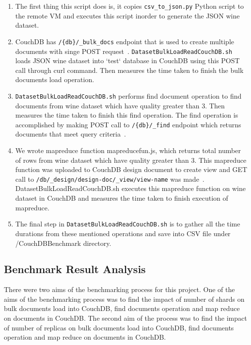 \begin{enumerate}
  \item The first thing this script does is, it copies
    \verb|csv_to_json.py| Python script to the remote VM and executes
    this script inorder to generate the JSON wine dataset.
  \item CouchDB has \verb|/{db}/_bulk_docs| endpoint that is used to
    create multiple documents with singe POST
    request~\cite{www-CouchdbBulkApi}. \verb|DatasetBulkLoadReadCouchDB.sh|
    loads JSON wine dataset into `test` database in CouchDB  using 
    this POST call through curl command. Then measures the time taken
    to finish the bulk documents load operation.

  \item \verb|DatasetBulkLoadReadCouchDB.sh| performs find document operation
    to find documents from wine dataset which have quality greater
    than 3. Then measures the time taken to finish this find
    operation. The find operation is accomplished by making POST call
    to \verb|/{db}/_find| endpoint which returns documents that meet
    query criteria~\cite{www-CouchdbFind}. 

  \item We wrote mapreduce function mapreducefun.js, which returns
    total number of rows from wine dataset which have quality greater than 3. This mapreduce
    function was uploaded to CouchDB design document to create view and GET call to
    \verb|/db/_design/design-doc/_view/view-name| was
    made~\cite{www-CouchdbView}. DatasetBulkLoadReadCouchDB.sh
    executes this mapreduce function on wine dataset in CouchDB and
    measures the time taken to finish execution of mapreduce.
  \item The final step in \verb|DatasetBulkLoadReadCouchDB.sh| is to gather
    all the time durations from these mentioned operations and save
    into CSV file under /CouchDBBenchmark directory.

\end{enumerate}

\subsection{Benchmark Result Analysis}
There were two aims of the benchmarking process for this project. One
of the aims of the benchmarking process was to find the impact of
number of shards on bulk documents load into CouchDB, find documents
operation and map reduce on documents in CouchDB. The second aim of
the process was to find the impact of number of replicas on bulk
documents load into CouchDB, find documents operation and map reduce
on documents in CouchDB. 

